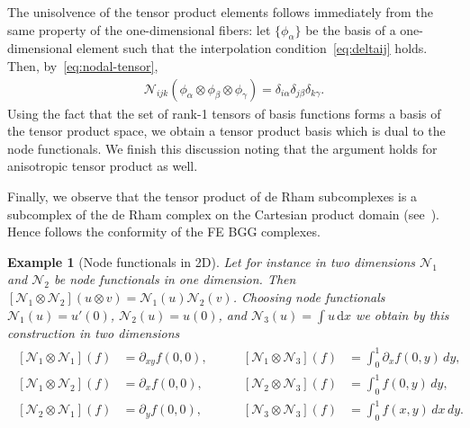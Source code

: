 \documentclass[final]{amsart}%
\newtheorem{example}{Example}
\newcommand{\0}{\mathaccent23}
\newcommand\dx{\,\mathrm{d}x}
\newcommand{\nodal}{\mathcal N}
\begin{document}
The unisolvence of the tensor product elements follows immediately from the same property of the one-dimensional fibers: let $\{\phi_\alpha\}$ be the basis of a one-dimensional element such that the interpolation condition~\eqref{eq:deltaij} holds. Then, by~\eqref{eq:nodal-tensor},
\begin{gather*}
    \nodal_{ijk}(\phi_\alpha\otimes\phi_\beta\otimes\phi_\gamma)
    = \delta_{i\alpha}\delta_{j\beta}\delta_{k\gamma}.
\end{gather*}
Using the fact that the set of rank-1 tensors of basis functions forms a basis of the tensor product space, we obtain a tensor product basis which is dual to the node functionals. We finish this discussion noting that the argument holds for anisotropic tensor product as well.

Finally, we observe that the tensor product of de Rham subcomplexes is a subcomplex of the de Rham complex on the Cartesian product domain (see~\cite{Arnold-Boffi-Bonizzoni}). Hence follows the conformity of the FE BGG complexes.

\begin{example}[Node functionals in 2D]
Let for instance in two dimensions $\nodal_1$ and $\nodal_2$ be node functionals in one dimension. Then
$[\nodal_1\otimes \nodal_2](u\otimes v) =\nodal_1(u)\nodal_2(v)$.
Choosing node functionals $\nodal_1(u) = u'(0)$, $\nodal_2(u) = u(0)$, and $\nodal_3(u)=\int u\dx$ we obtain by this construction in two dimensions
\begin{gather}
\label{eq:tensor-product-dofs}
\begin{aligned}
    [\nodal_1\otimes \nodal_1] (f) &= \partial_{xy} f(0,0),\qquad
    & [\nodal_1\otimes \nodal_3] (f) &= \int_0^1 \partial_x f(0,y)\,dy,\\
    [\nodal_1\otimes \nodal_2] (f) &= \partial_{x} f(0,0),
    & [\nodal_2\otimes \nodal_3] (f) &= \int_0^1 f(0,y)\,dy,\\
    [\nodal_2\otimes \nodal_1] (f) &= \partial_{y} f(0,0),
    & [\nodal_3\otimes \nodal_3] (f) &= \int_0^1 f(x,y)\,dx\,dy.
\end{aligned}
\end{gather}
\end{example}
\end{document}
